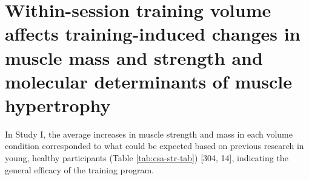 \documentclass[twoside,10pt]{gihclass} %
\begin{document}
\hypertarget{muscle-mass-growth}{%
\section{Within-session training volume affects training-induced changes in muscle mass and strength and molecular determinants of muscle hypertrophy}\label{muscle-mass-growth}}

In Study I, the average increases in muscle strength and mass in each volume condition corresponded to what could be expected based on previous research in young, healthy participants (Table \ref{tab:csa-str-tab})
{[}304, 14{]},
indicating the general efficacy of the training program.




\begin{table}


\end{table}
\end{document}
